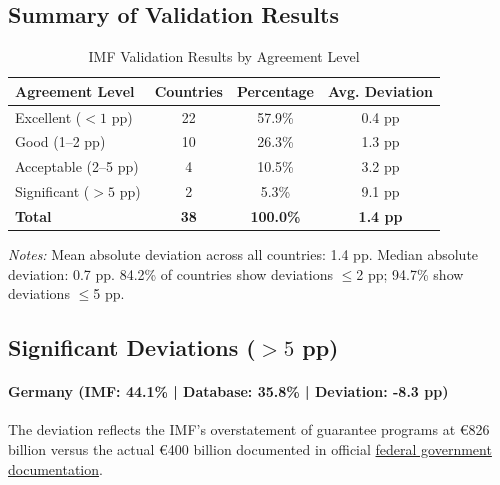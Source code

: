 \documentclass[12pt]{article}
\begin{document}
\subsection{Summary of Validation Results}

\begin{table}[htbp]
\centering
\caption{IMF Validation Results by Agreement Level}
\label{tab:imf_validation}
\small
\begin{threeparttable}
\begin{tabular}{@{}lccc@{}}
\toprule
\textbf{Agreement Level} & \textbf{Countries} & \textbf{Percentage} & \textbf{Avg. Deviation} \\
\midrule
Excellent ($<1$ pp) & 22 & 57.9\% & 0.4 pp \\
Good (1--2 pp) & 10 & 26.3\% & 1.3 pp \\
Acceptable (2--5 pp) & 4 & 10.5\% & 3.2 pp \\
Significant ($>5$ pp) & 2 & 5.3\% & 9.1 pp \\
\midrule
\textbf{Total} & \textbf{38} & \textbf{100.0\%} & \textbf{1.4 pp} \\
\bottomrule
\end{tabular}
\begin{tablenotes}
\small
\item \textit{Notes:} Mean absolute deviation across all countries: 1.4 pp. Median absolute deviation: 0.7 pp. 84.2\% of countries show deviations $\leq$2 pp; 94.7\% show deviations $\leq$5 pp.
\end{tablenotes}
\end{threeparttable}
\end{table}

\subsection{Significant Deviations ($>5$ pp)}

\paragraph{Germany (IMF: 44.1\% | Database: 35.8\% | Deviation: -8.3 pp)}

The deviation reflects the IMF's overstatement of guarantee programs at €826 billion versus the actual €400 billion documented in official \href{https://www.advant-nctm.com/en/news/germany-overview-of-all-support-measures-of-the-federal-government-and-each-individual-federal-state}{federal government documentation}.
\end{document}
